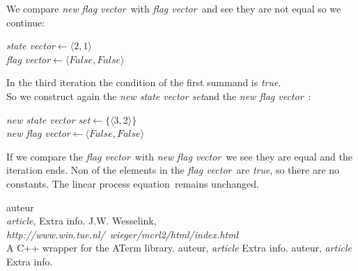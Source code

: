 \documentclass[a4paper,10pt]{article}
\newcommand{\lpe}{linear process equation}
\newcommand{\ti}{\textit}
\newcommand{\sv}{\textit{state vector}}
\newcommand{\fv}{\textit{flag vector}}
\newcommand{\svs}{\textit{new state vector set}}
\newcommand{\nfv}{\textit{new flag vector}}
\newcommand{\la}{$\leftarrow$}
\begin{document}
We compare \ti{new} \fv\ with \fv\ and see they are not equal so we continue:
\begin{center}\begin{minipage}{250pt}
\sv \la $\langle 2 , 1 \rangle $\\
\fv \la $\langle False , False \rangle $\\
\end{minipage}\end{center}

In the third iteration the condition of the first summand is \ti{true}.\\
So we construct again the \svs and the \nfv\ : 
\begin{center}\begin{minipage}{250pt}
\svs \la  $\lbrace \langle 3 , 2 \rangle \rbrace $\\
\nfv \la  $\langle False , False \rangle $ \\
\end{minipage}\end{center}

If we compare the \fv\ with \ti{new} \fv\ we see they are equal and the iteration ends.
Non of the elements in the \fv\ are \ti{true}, so there are no constants. The \lpe\ remains unchanged.


\newpage
\begin{thebibliography}{99}   auteur\\
   \textit{article},
   Extra info.
   J.W. Wesselink,
   \textit{http://www.win.tue.nl/~wieger/mcrl2/html/index.html}\\
   A C++ wrapper for the ATerm library.
   auteur,
   \textit{article}
   Extra info.
   auteur,
   \textit{article}
   Extra info.

\end{thebibliography}

\newpage
\end{document}
